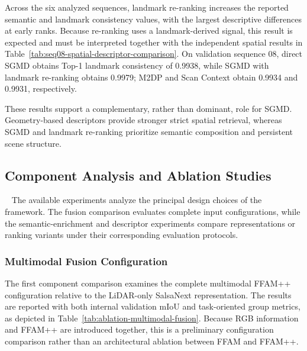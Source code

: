 Across the six analyzed sequences, landmark re-ranking increases the reported semantic and landmark consistency values, with the largest descriptive differences at early ranks. Because re-ranking uses a landmark-derived signal, this result is expected and must be interpreted together with the independent spatial results in Table~\ref{tab:seq08-spatial-descriptor-comparison}. On validation sequence 08, direct SGMD obtains Top-1 landmark consistency of 0.9938, while SGMD with landmark re-ranking obtains 0.9979; M2DP and Scan Context obtain 0.9934 and 0.9931, respectively.

These results support a complementary, rather than dominant, role for SGMD. Geometry-based descriptors provide stronger strict spatial retrieval, whereas SGMD and landmark re-ranking prioritize semantic composition and persistent scene structure.

\subsection{Component Analysis and Ablation Studies}~\label{subsec:ablation-study}
The available experiments analyze the principal design choices of the framework. The fusion comparison evaluates complete input configurations, while the semantic-enrichment and descriptor experiments compare representations or ranking variants under their corresponding evaluation protocols.

\subsubsection{Multimodal Fusion Configuration}
The first component comparison examines the complete multimodal FFAM++ configuration relative to the LiDAR-only SalsaNext representation. The results are reported with both internal validation mIoU and task-oriented group metrics, as depicted in Table~\ref{tab:ablation-multimodal-fusion}. Because RGB information and FFAM++ are introduced together, this is a preliminary configuration comparison rather than an architectural ablation between FFAM and FFAM++.


